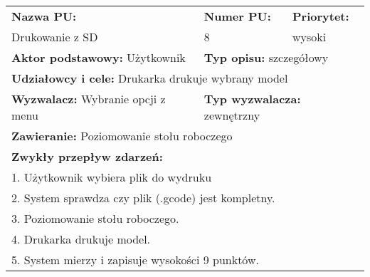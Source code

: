 \documentclass{article}
\begin{document}
\begin{enumerate}[label=\arabic*.]
\newpage
\begin{tabular}{|p{5cm}|p{3cm}|p{3cm}|p{3cm}|p{}|p{3cm}|}
\hline
\multicolumn{4}{|l|}{\textbf{Nazwa PU:}} & \multicolumn{1}{l|}{\textbf{Numer PU:}} & \multicolumn{1}{|l|}{\textbf{Priorytet:} } \\ 
\multicolumn{4}{|l|}{Drukowanie z SD} & \multicolumn{1}{l|}{8} & \multicolumn{1}{|l|}{wysoki}\\ \hline
\multicolumn{3}{|l|}{\textbf{Aktor podstawowy:} Użytkownik} & \multicolumn{3}{l|}{\textbf{Typ opisu:} szczegółowy} \\ \hline
\multicolumn{6}{|l|}{\textbf{Udziałowcy i cele:} Drukarka drukuje wybrany model} \\ 
\multicolumn{3}{|l|}{\textbf{Wyzwalacz:} Wybranie opcji z menu} & \multicolumn{3}{l|}{\textbf{Typ wyzwalacza:} zewnętrzny} \\ 
\hline
\multicolumn{6}{|l|}{\textbf{Zawieranie:} Poziomowanie stołu roboczego} \\ \hline
\multicolumn{6}{|l|}{\textbf{Zwykły przepływ zdarzeń:}} \\
\multicolumn{6}{|l|}{1. Użytkownik wybiera plik do wydruku} \\
\multicolumn{6}{|l|}{2. System sprawdza czy plik (.gcode) jest kompletny.} \\
\multicolumn{6}{|l|}{3. Poziomowanie stołu roboczego.} \\
\multicolumn{6}{|l|}{4. Drukarka drukuje model.} \\
\multicolumn{6}{|l|}{5. System mierzy i zapisuje wysokości 9 punktów.} \\
\hline
\end{tabular}


\end{enumerate}
\end{document}
